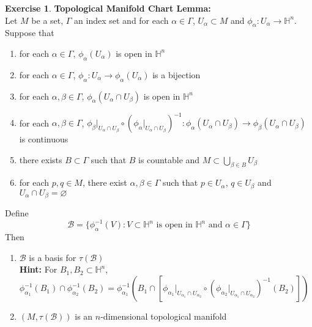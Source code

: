 \documentclass{book}
\theoremstyle{definition}
\newtheorem{ex}[definition]{Exercise}
\newcommand{\al}{\alpha}
\newcommand{\be}{\beta}
\newcommand{\Gam}{\Gamma}
\renewcommand{\H}{\mathbb{H}}
\newcommand{\MB}{\mathcal{B}}
\DeclareMathOperator*{\0}{\mbf{0}}
\DeclareMathOperator*{\1}{\mbf{1}}
\newcommand{\tbf}[1]{\textbf{#1}}
\begin{document}
	\begin{ex} \tbf{Topological Manifold Chart Lemma:} \\
		Let $M$ be a set, $\Gam$ an index set and for each $\al \in \Gam$, $U_{\al} \subset M$ and $\phi_{\al}: U_{\al} \rightarrow \H^n$. Suppose that 
		\begin{enumerate}[label=(\alph*)]
			\item for each $\al \in \Gam$, $\phi_{\al}(U_{\al})$ is open in $\H^n$ 
			\item for each $\al \in \Gam$, $\phi_{\al}: U_{\al} \rightarrow \phi_{\al}(U_{\al})$ is a bijection
			\item for each $\al, \be \in \Gam$, $\phi_{\al}(U_{\al} \cap U_{\be})$ is open in $\H^n$
			\item for each $\al, \be \in \Gam$, $\phi_{\be}|_{U_{\al} \cap U_{\be}} \circ (\phi_{\al}|_{U_{\al} \cap U_{\be}})^{-1}: \phi_{\al}(U_{\al} \cap U_{\be}) \rightarrow \phi_{\be}(U_{\al} \cap U_{\be})$ is continuous
			\item there exists $B \subset \Gam$ such that $B$ is countable and $M \subset \bigcup\limits_{\be \in B} U_{\be}$
			\item for each $p,q \in M$, there exist $\al,\be \in \Gam$ such that $p \in U_{\al}$, $q \in U_{\be}$ and $U_{\al} \cap U_{\be} = \varnothing$
		\end{enumerate}
		Define $$\MB = \{\phi_{\al}^{-1}(V): V \subset \H^n \text{ is open in $\H^n$ and $\al \in \Gam$} \}$$
		Then  
		\begin{enumerate}
			\item $\MB$ is a basis for $\tau(\MB)$ \\
			\tbf{Hint:} For $B_1, B_2 \subset \H^n$, $\phi_{\al_1}^{-1}(B_1) \cap \phi_{\al_2}^{-1}(B_2) = \phi_{\al_1}^{-1}( B_1 \cap [\phi_{\al_1}|_{U_{\al_1} \cap U_{\al_2}} \circ (\phi_{\al_2}|_{U_{\al_1} \cap U_{\al_2}})^{-1}(B_2)])$
			\item $(M, \tau(\MB))$ is an $n$-dimensional topological manifold
		\end{enumerate}
	\end{ex}
	
\end{document}
